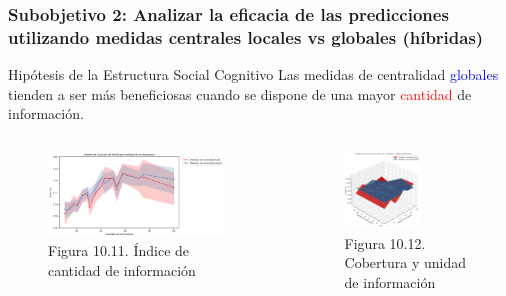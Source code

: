 \documentclass{beamer}
\begin{document}
\begin{frame}
	\frametitle{Subobjetivo 2: Analizar la eficacia de las predicciones utilizando medidas centrales  locales vs globales (híbridas)}
\begin{block}{Hipótesis de la Estructura Social Cognitivo }
Las medidas de centralidad \textcolor{blue}{globales} tienden a ser más beneficiosas cuando se dispone de una mayor  \textcolor{red}{cantidad} de información.
\end{block}
	\begin{columns}[c]
		\begin{column}{.5\textwidth}
			\begin{figure}
				\centering
				\includegraphics[width=0.9\textwidth]{figs/cap7/figura_45}
				\caption{Figura 10.11. Índice de cantidad de información}
			\end{figure}      
		\end{column}
		\begin{column}{.5\textwidth}
			\begin{figure}
				\centering
				\includegraphics[width=0.6\textwidth]{figs/cap7/figura_46}
			\caption{Figura 10.12. Cobertura y unidad de información}
			\end{figure}
		\end{column}
	\end{columns}
\end{frame}
\end{document}
